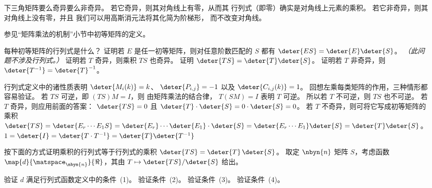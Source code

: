 \begin{exercises}
\begin{answer}
      下三角矩阵要么奇异要么非奇异。
      若它奇异，则其对角线上有零，从而其
      行列式（即零）确实是对角线上元素的乘积。 
      若它非奇异，则其对角线上没有零，并且
      我们可以用高斯消元法将其化简为阶梯形，
      而不改变对角线。  
    \end{answer}
  \item
    参见“矩阵乘法的机制”小节中初等矩阵的定义。
    \begin{exparts}
      \partsitem 每种初等矩阵的行列式是什么？
      \partsitem 证明若 \( E \) 是任一初等矩阵，则对任意阶数匹配的
        \( S \) 都有
        \( \deter{ES}=\deter{E}\deter{S} \)。
      \partsitem \textit{（此问题不涉及行列式。）}
        证明若 \( T \) 奇异，则乘积 \( TS \)
        也奇异。
      \partsitem 证明 \( \deter{TS}=\deter{T}\deter{S} \)。
      \partsitem 证明若 \( T \) 非奇异，则
          \( \deter{T^{-1}}=\deter{T}^{-1} \)。
    \end{exparts}
    \begin{answer}
      \begin{exparts}
        \partsitem 行列式定义中的诸性质表明
          \( \deter{M_i(k)}=k \)、
          \( \deter{P_{i,j}}=-1 \)
          以及
          \( \deter{C_{i,j}(k)}=1 \)。
        \partsitem 回想左乘每类矩阵的作用，三种情形都容易验证。
        \partsitem 若 \( TS \) 可逆，即 \( (TS)M=I \)，则
          由矩阵乘法的结合律，
          \( T(SM)=I \) 表明 \( T \) 可逆。
          所以若 \( T \) 不可逆，则 \( TS \) 也不可逆。
        \partsitem 若 \( T \) 奇异，则应用前面的答案：
          \( \deter{TS}=0 \) 且
          \( \deter{T}\cdot\deter{S}=0\cdot\deter{S}=0 \)。
          若 \( T \) 不奇异，则可将它写成初等矩阵的乘积
          $
            \deter{TS}=\deter{E_r\cdots E_1S}=
            \deter{E_r}\cdots\deter{E_1}\cdot\deter{S}=
            \deter{E_r\cdots E_1}\deter{S}=\deter{T}\deter{S}
          $。
        \partsitem \( 1=\deter{I}=\deter{T\cdot T^{-1}}
                     =\deter{T}\deter{T^{-1}} \)
      \end{exparts}  
     \end{answer} 
  \item 
    按下面的方式证明乘积的行列式等于行列式的乘积
    \( \deter{TS}=\deter{T}\,\deter{S} \)。
    取定 \( \nbyn{n} \) 矩阵 \( S \)，考虑函数
    \( \map{d}{\matspace_{\nbyn{n}}}{\Re} \)，其由
    \( T\mapsto \deter{TS}/\deter{S} \) 给出。
    \begin{exparts}
      \partsitem 验证 \( d \) 满足行列式函数定义中的条件~(1)。
      \partsitem 验证条件~(2)。
      \partsitem 验证条件~(3)。
      \partsitem 验证条件~(4)。

\end{exparts}
\end{exercises}
